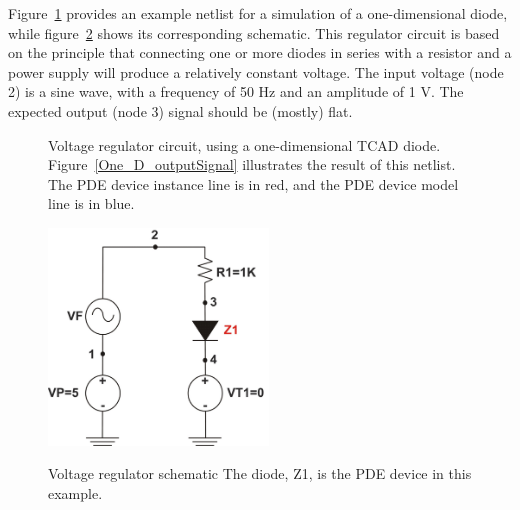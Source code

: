 Figure~\ref{One_D_Diode_Netlist} provides an example netlist for a simulation of a one-dimensional diode, while figure~\ref{One_D_Diode_Schem} shows its corresponding schematic.  This regulator circuit is based on the principle that connecting one or more diodes
in series with a resistor and a power supply will produce a relatively constant voltage.  The input voltage (node 2) is a sine wave, with a
frequency of 50 Hz and an amplitude of 1 V.  
The expected output (node 3) signal should be (mostly) flat.  
\begin{figure}
  \begin{centering}
\caption[One-dimensional diode netlist]
{Voltage regulator circuit, using a one-dimensional TCAD diode.
Figure~\ref{One_D_outputSignal} illustrates the result of this netlist. The PDE
device instance line is in red, and the PDE device model line is in blue.
\label{One_D_Diode_Netlist} }
\end{centering}
\end{figure}

\begin{figure}
  \centering
  \scalebox{1.0}
  {\includegraphics[width=2.300in,height= 2.270in]{diodeRegulatorSchem}}
  \caption[Voltage regulator schematic]{Voltage regulator schematic
The diode, Z1, is the PDE device in this example.\label{One_D_Diode_Schem}}
\end{figure}

